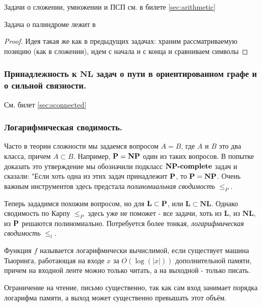 Задачи о сложении, умножении и ПСП см. в билете \ref{sec:arithmetic}
\begin{statement}
    Задача о палиндроме лежит в \lsp
\end{statement}

\begin{proof}
    Идея такая же как в предыдущих задачах: храним рассматриваемую позицию (как в сложении), идем с начала и с конца и сравниваем символы
\end{proof}

\subsubsection{Принадлежность к $\mathbf{NL}$ задач о пути в ориентированном графе и о сильной связности.}

См. билет \ref{sec:sconnected}

\subsubsection{Логарифмическая сводимость.}

Часто в теории сложности мы задаемся вопросом $A = B$, где $A$ и $B$ это два класса, причем $A \subset B$. Например, $\textbf{P} = \textbf{NP}$ один из таких вопросов. В попытке доказать это утверждение мы обозначили подкласс $\textbf{NP-complete}$ задач и сказали: "Если хоть одна из этих задач принадлежит $\textbf{P}$, то $\textbf{P} = \textbf{NP}$. Очень важным инструментов здесь предстала \emph{полиномиальная сводимость} $\leq_P$. 

Теперь зададимся похожим вопросом, но для $\mathbf{L} \subset \textbf{P}$, или $\mathbf{L} \subset \mathbf{NL}$. Однако сводимость по Карпу $\leq_P$ здесь уже не поможет - все задачи, хоть из $\mathbf{L}$, из $\mathbf{NL}$, из $\textbf{P}$ решаются полиномиально. Потребуется более тонкая, \emph{логарифмическая сводимость} $\leq_l$.

\begin{definition}
Функция $f$ называется логарифмически вычислимой, если существует машина Тьюринга, работающая на входе $x$ за $O(\log(|x|))$ дополнительной памяти, причем на входной ленте можно только читать, а на выходной - только писать.  
\end{definition}

\begin{lemmanote}
Ограничение на чтение, письмо существенно, так как сам вход занимает порядка логарифма памяти, а выход может существенно превышать этот объём. 
\end{lemmanote}



